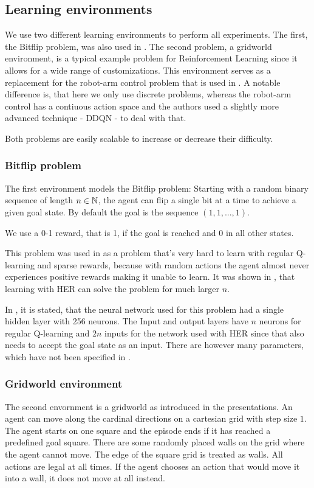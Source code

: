 \subsection{Learning environments}
We use two different learning environments to perform all experiments.
The first, the Bitflip problem, was also used in \parencite{HERPaper}. The second problem, a gridworld environment, is a typical example problem for Reinforcement Learning since it allows for a wide range of customizations. This environment serves as a replacement for the robot-arm control problem that is used in \parencite{HERPaper}. A notable difference is, that here we only use discrete problems, whereas the robot-arm control has a contiuous action space and the authors used a slightly more advanced technique - DDQN - to deal with that.

Both problems are easily scalable to increase or decrease their difficulty.

\subsubsection{Bitflip problem}
The first environment models the Bitflip problem: Starting with a random binary sequence of length $n\in\mathbb{N}$, the agent can flip a single bit at a time to achieve a given goal state.
By default the goal is the sequence $(1,1,...,1)$.

We use a 0-1 reward, that is 1, if the goal is reached and 0 in all other states.

This problem was used in \parencite{HERPaper} as a problem that's very hard to learn with regular Q-learning and sparse rewards, because with random actions the agent almost never experiences positive rewards making it unable to learn.
It was shown in \parencite{HERPaper}, that learning with HER can solve the problem for much larger $n$.

In \parencite[Appendix A]{HERPaper}, it is stated, that the neural network used for this problem had a single hidden layer with 256 neurons. The Input and output layers have $n$ neurons for regular Q-learning and $2n$ inputs for the network used with HER since that also needs to accept the goal state as an input.
There are however many parameters, which have not been specified in \parencite{HERPaper}.
%
\subsubsection{Gridworld environment}
The second envornment is a gridworld as introduced in the presentations. An agent can move along the cardinal directions on a cartesian grid with step size $1$. The agent starts on one square and the episode ends if it has reached a predefined goal square. There are some randomly placed walls on the grid where the agent cannot move. The edge of the square grid is treated as walls.
All actions are legal at all times. If the agent chooses an action that would move it into a wall, it does not move at all instead.
%
